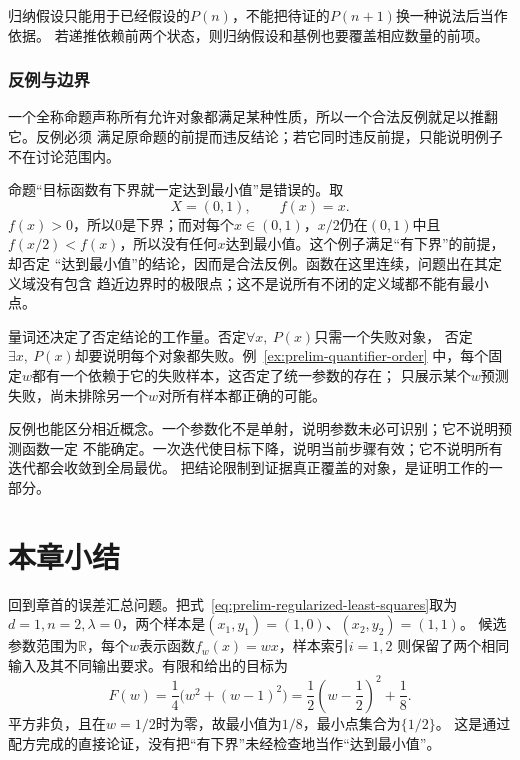 归纳假设只能用于已经假设的$P(n)$，不能把待证的$P(n+1)$换一种说法后当作依据。
若递推依赖前两个状态，则归纳假设和基例也要覆盖相应数量的前项。

\subsubsection{反例与边界}
\label{sec:prelim-counterexamples-boundaries}

一个全称命题声称所有允许对象都满足某种性质，所以一个合法反例就足以推翻它。反例必须
满足原命题的前提而违反结论；若它同时违反前提，只能说明例子不在讨论范围内。

\begin{example}[有下界但没有最小点]
\label{ex:prelim-bounded-without-minimum}
命题“目标函数有下界就一定达到最小值”是错误的。取
\[
  X=(0,1),\qquad f(x)=x.
\]
$f(x)>0$，所以$0$是下界；而对每个$x\in(0,1)$，$x/2$仍在$(0,1)$中且
$f(x/2)<f(x)$，所以没有任何$x$达到最小值。这个例子满足“有下界”的前提，却否定
“达到最小值”的结论，因而是合法反例。函数在这里连续，问题出在其定义域没有包含
趋近边界时的极限点；这不是说所有不闭的定义域都不能有最小点。
\end{example}

量词还决定了否定结论的工作量。否定$\forall x,\ P(x)$只需一个失败对象，
否定$\exists x,\ P(x)$却要说明每个对象都失败。例~\ref{ex:prelim-quantifier-order}
中，每个固定$w$都有一个依赖于它的失败样本，这否定了统一参数的存在；
只展示某个$w$预测失败，尚未排除另一个$w$对所有样本都正确的可能。

反例也能区分相近概念。一个参数化不是单射，说明参数未必可识别；它不说明预测函数一定
不能确定。一次迭代使目标下降，说明当前步骤有效；它不说明所有迭代都会收敛到全局最优。
把结论限制到证据真正覆盖的对象，是证明工作的一部分。

\section{本章小结}
\label{sec:prelim-sets-functions-summary}

回到章首的误差汇总问题。把式~\eqref{eq:prelim-regularized-least-squares}取为
$d=1,n=2,\lambda=0$，两个样本是$(x_1,y_1)=(1,0)$、$(x_2,y_2)=(1,1)$。
候选参数范围为$\mathbb{R}$，每个$w$表示函数$f_w(x)=wx$，样本索引$i=1,2$
则保留了两个相同输入及其不同输出要求。有限和给出的目标为
\[
  F(w)=\frac14\bigl(w^2+(w-1)^2\bigr)
      =\frac12\left(w-\frac12\right)^2+\frac18.
\]
平方非负，且在$w=1/2$时为零，故最小值为$1/8$，最小点集合为$\{1/2\}$。
这是通过配方完成的直接论证，没有把“有下界”未经检查地当作“达到最小值”。

